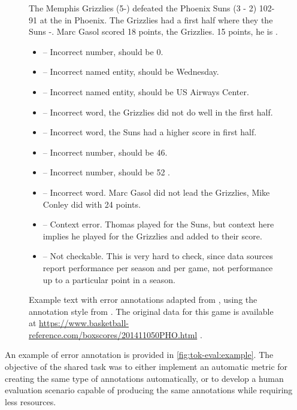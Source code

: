 \begin{figure}[t]
    \footnotesize
    The Memphis Grizzlies (5-) defeated the Phoenix Suns (3 - 2)  102-91 at the  in Phoenix. The Grizzlies had a  first half where they  the Suns -. Marc Gasol scored 18 points,  the Grizzlies.   15 points, he is .
    \vspace{1mm}

    \begin{itemize}
        \item {}                                       -- Incorrect number, should be 0.
        \item {}                                  -- Incorrect named entity, should be Wednesday.
        \item {}              -- Incorrect named entity, should be US Airways Center.
        \item {}                                 -- Incorrect word, the Grizzlies did not do well in the first half.
        \item {}                             -- Incorrect word, the Suns had a higher score in first half.
        \item {}                                      -- Incorrect number, should be 46.
        \item {}                                      -- Incorrect number, should be 52 .
        \item {}                                -- Incorrect word.  Marc Gasol did not lead the Grizzlies, Mike Conley did with 24 points.
        \item {}                     -- Context error.  Thomas played for the Suns, but context here implies he played for the Grizzlies and added to their score.
        \item {} -- Not checkable.  This is very hard to check, since data sources report performance per season and per game, not performance up to a particular point in a season.
    \end{itemize}
    \caption{Example text with error annotations adapted from \citet{thomsonGenerationChallengesResults2021}, using the annotation style from \citet{thomsonEvaluatingFactualAccuracy2023}. The original data for this game is available at \url{https://www.basketball-reference.com/boxscores/201411050PHO.html} .}
    \label{fig:tok-eval:example}
\end{figure}
An example of error annotation is provided in \autoref{fig:tok-eval:example}. The objective of the shared task was to either implement an automatic metric for creating the same type of annotations automatically, or to develop a human evaluation scenario capable of producing the same annotations while requiring less resources.


